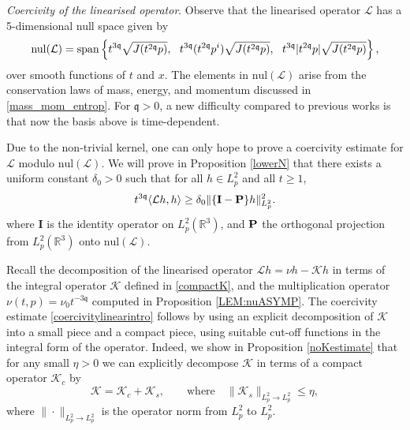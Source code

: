 \documentclass[reqno]{amsart}
\newcommand{\pv}{p}
\newcommand{\rth}{{\mathbb{R}^3}}
\newcommand{\qq}{\mathfrak{q}}
\newcommand{\tqq}{t^{2\qq}}
\newcommand{\tTq}{t^{3\qq}}
\newcommand{\linL}{\mathcal{L}}
\newcommand{\micro}{{\bf \{I- P\}}}
\newcommand{\CN}{\mathrm{nul}}
\theoremstyle{definition}
\numberwithin{equation}{section}
\numberwithin{theorem}{section}
\begin{document}
\textit{Coercivity of the linearised operator}.  Observe that the linearised operator \(\mathcal{L}\) has a 5-dimensional null space given by 
\begin{equation}\notag 
{\CN}(\linL)= {\rm span}\left\{
\tTq \sqrt{J(\tqq p)},~~\tTq (\tqq p^{i})  \sqrt{J(\tqq p)},  ~~
\tTq |\tqq \pv |\sqrt{J(\tqq p)}\right\},
\end{equation} 
over smooth functions of \(t\) and \(x\). The elements in \({\CN}(\linL)\) arise from the conservation laws of mass, energy, and momentum discussed in \eqref{mass_mom_entrop}. For \(\qq>0\), a new difficulty compared to previous works is that now the basis above is time-dependent.  


Due to the non-trivial kernel, one can only hope to prove a coercivity estimate for \(\mathcal{L}\) modulo ${\CN}(\linL)$. We will prove in Proposition \ref{lowerN} that there exists a uniform constant \(\delta_0>0\) such that for all \(h\in L^2_p\) and all \(t\geq 1\),
\begin{equation}\label{coercivitylinearintro}
  \tTq\langle \linL h, h \rangle
\geq
\delta_0 
\| \micro  h \|_{L^2_p}^2.
\end{equation}
where \(\mathbf{I}\) is the identity operator on $L^2_p(\rth)$, and ${\bf P}$ the orthogonal projection from $L^2_p(\rth)$ onto ${\CN}(\linL)$. 



Recall the decomposition of the linearised operator 
\(
\mathcal{L}h=\nu h-\mathcal{K}h
\)
in terms of the integral operator \(\mathcal{K}\) defined in \eqref{compactK}, and the multiplication operator \(\nu(t,p)= \nu_0 t^{-3\qq}\) computed in Proposition \ref{LEM:nuASYMP}. The coercivity estimate \eqref{coercivitylinearintro} follows by using an explicit decomposition of \(\mathcal{K}\) into a small piece and a compact piece, using suitable cut-off functions in the integral form of the operator. Indeed, we show in Proposition \ref{noKestimate} that for any small \(\eta>0\) we can explicitly decompose \(\mathcal{K}\) in terms of a compact operator \(\mathcal{K}_c\) by
\begin{equation}\label{smallcompactdecomp0}
\mathcal{K}=\mathcal{K}_c+\mathcal{K}_s, \qquad \text{where}\quad  \|\mathcal{K}_s\|_{L^2_p\to L^2_p}\leq \eta,
\end{equation}
where \(\|\cdot\|_{L^2_p\to L^2_p}\) is the operator norm from \(L^2_p\) to \(L^2_p\). 
\end{document}
